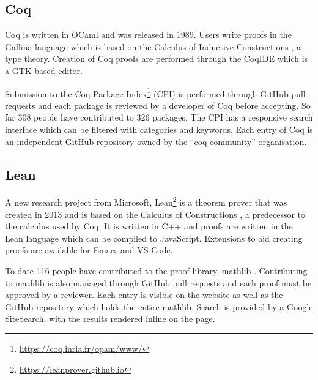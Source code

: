 \documentclass[bsc,frontabs,oneside,singlespacing,parskip,deptreport,logo]{infthesis}
\newcommand{\toupdate}[1]{} %
\begin{document}
\subsection{Coq}

Coq is written in OCaml and was released in 1989. Users write proofs in the Gallina language which is based on the Calculus of Inductive Constructions \cite{DBLP:conf/tapsoft/Huet87}, a type theory. Creation of Coq proofs are performed through the CoqIDE which is a GTK based editor. 

Submission to the Coq Package Index\footnote{\url{https://coq.inria.fr/opam/www/}} (CPI) is performed through GitHub pull requests and each package is reviewed by a developer of Coq before accepting. So far 308 people have contributed to 326 packages\toupdate{I think I did this by hand? https://coq.inria.fr/opam/www/}. The CPI has a responsive search interface which can be filtered with categories and keywords. Each entry of Coq is an independent GitHub repository owned by the ``coq-community'' organisation.

\subsection{Lean}

A new research project from Microsoft, Lean\footnote{\url{https://leanprover.github.io}} is a theorem prover that was created in 2013 and is based on the Calculus of Constructions \cite{coquand1988calculus}, a predecessor to the calculus used by Coq. It is written in C++ and proofs are written in the Lean language which can be compiled to JavaScript. Extensions to aid creating proofs are available for Emacs and VS Code. 

To date 116 people have contributed to the proof library\toupdate{https://leanprover-community.github.io/mathlib_stats.html}, mathlib \cite{mathlib_Community_2020}. Contributing to mathlib is also managed through GitHub pull requests and each proof must be approved by a reviewer. Each entry is visible on the website as well as the GitHub repository which holds the entire mathlib. Search is provided by a Google SiteSearch, with the results rendered inline on the page.

\cbend
\end{document}
